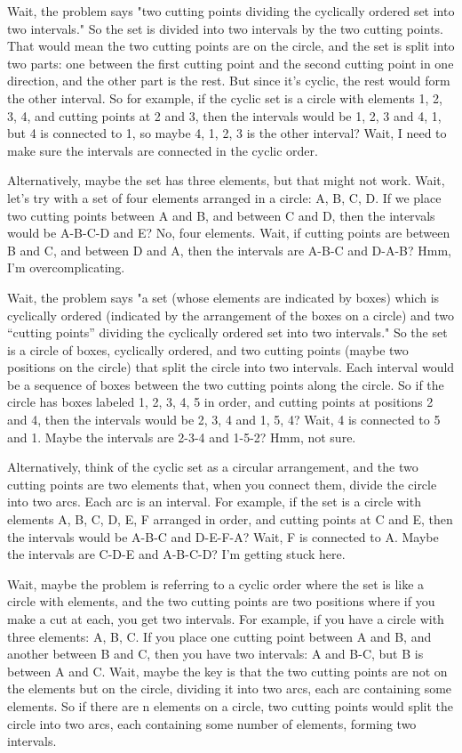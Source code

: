 Wait, the problem says "two cutting points dividing the cyclically ordered set into two intervals." So the set is divided into two intervals by the two cutting points. That would mean the two cutting points are on the circle, and the set is split into two parts: one between the first cutting point and the second cutting point in one direction, and the other part is the rest. But since it's cyclic, the rest would form the other interval. So for example, if the cyclic set is a circle with elements 1, 2, 3, 4, and cutting points at 2 and 3, then the intervals would be {1, 2, 3} and {4, 1}, but 4 is connected to 1, so maybe {4, 1, 2, 3} is the other interval? Wait, I need to make sure the intervals are connected in the cyclic order.

Alternatively, maybe the set has three elements, but that might not work. Wait, let's try with a set of four elements arranged in a circle: A, B, C, D. If we place two cutting points between A and B, and between C and D, then the intervals would be A-B-C-D and E? No, four elements. Wait, if cutting points are between B and C, and between D and A, then the intervals are A-B-C and D-A-B? Hmm, I'm overcomplicating.

Wait, the problem says "a set (whose elements are indicated by boxes) which is cyclically ordered (indicated by the arrangement of the boxes on a circle) and two ``cutting points'' dividing the cyclically ordered set into two intervals." So the set is a circle of boxes, cyclically ordered, and two cutting points (maybe two positions on the circle) that split the circle into two intervals. Each interval would be a sequence of boxes between the two cutting points along the circle. So if the circle has boxes labeled 1, 2, 3, 4, 5 in order, and cutting points at positions 2 and 4, then the intervals would be 2, 3, 4 and 1, 5, 4? Wait, 4 is connected to 5 and 1. Maybe the intervals are 2-3-4 and 1-5-2? Hmm, not sure.

Alternatively, think of the cyclic set as a circular arrangement, and the two cutting points are two elements that, when you connect them, divide the circle into two arcs. Each arc is an interval. For example, if the set is a circle with elements A, B, C, D, E, F arranged in order, and cutting points at C and E, then the intervals would be A-B-C and D-E-F-A? Wait, F is connected to A. Maybe the intervals are C-D-E and A-B-C-D? I'm getting stuck here.

Wait, maybe the problem is referring to a cyclic order where the set is like a circle with elements, and the two cutting points are two positions where if you make a cut at each, you get two intervals. For example, if you have a circle with three elements: A, B, C. If you place one cutting point between A and B, and another between B and C, then you have two intervals: A and B-C, but B is between A and C. Wait, maybe the key is that the two cutting points are not on the elements but on the circle, dividing it into two arcs, each arc containing some elements. So if there are n elements on a circle, two cutting points would split the circle into two arcs, each containing some number of elements, forming two intervals.

